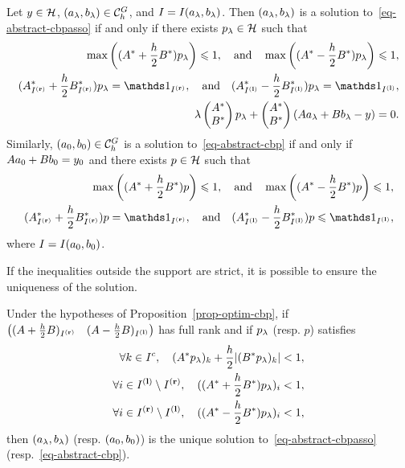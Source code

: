 \begin{prop}
  Let $y\in \mathcal{H}$, $(a_\lambda,b_\lambda) \in \mathcal{C}_h^G$, and $I=I(a_\lambda,b_\lambda)$. Then $(a_\lambda,b_\lambda)$ is a solution to~\eqref{eq-abstract-cbpasso} if and only if there exists $p_\lambda\in \mathcal{H}$ such that
\begin{align}
  \max\left( (\OpU^*+\frac{h}{2}\OpD^*)p_\la\right) \leq 1, \qandq \max\left( (\OpU^*-\frac{h}{2}\OpD^*)p_{\la}\right) \leq 1,\\
  (\OpU_{\Iup}^*+\frac{h}{2}\OpD_{\Iup}^*)p_{\la} =\bun_{\Iup}, \qandq (\OpU_{\Idown}^*-\frac{h}{2}\OpD_{\Idown}^*)p_{\la} = \bun_{\Idown},\label{eq-optimal-cbp-subdiff}\\
  \la \begin{pmatrix}\OpU^* \\ \OpD^* \end{pmatrix}p_{\la} + \begin{pmatrix}\OpU^* \\ \OpD^*\end{pmatrix}(\OpU \veccont_\la +\OpD \shiftcont_\la-y) =0. \label{eq-optimal-cbp-lagrange}
\end{align}
Similarly,  $(a_0,b_0)\in \mathcal{C}_h^G$ is a solution to~\eqref{eq-abstract-cbp} if and only if ${A}a_0 + {B}b_0=y_0$ and there exists $p\in \mathcal{H}$ such that
 \begin{align}
   \max\left( (\OpU^*+\frac{h}{2}\OpD^*)p\right) \leq 1, \qandq \max\left((\OpU^*-\frac{h}{2}\OpD^*)p\right) \leq 1,\\
  (\OpU_{\Iup}^*+\frac{h}{2}\OpD_{\Iup}^*)p =\bun_{\Iup}, \qandq (\OpU_{\Idown}^*-\frac{h}{2}\OpD_{\Idown}^*)p \leq \bun_{\Idown},
\end{align}
  where $I=I(a_0,b_0)$.
 \label{prop-optim-cbp}
\end{prop}

If the inequalities outside the support are strict, it is possible to ensure the uniqueness of the solution.

\begin{prop}
  Under the hypotheses of Proposition~\ref{prop-optim-cbp}, if $\begin{pmatrix}({A}+\frac{h}{2}{B})_{{I^{\mathbf{(r)}}}} &({A}-\frac{h}{2}{B})_{{I^{\mathbf{(l)}}}}\end{pmatrix}$ has full rank and if $p_\lambda$ (resp. $p$) satisfies
  \begin{align}
\forall k\in I^c, \quad  ({A}^*p_\lambda)_k+ \frac{h}{2}|({B}^*p_\lambda)_k| <1,\\
\forall i\in {I^{\mathbf{(l)}}}\setminus{I^{\mathbf{(r)}}},\quad  (({A}^* + \frac{h}{2}{B}^*)p_\lambda)_i <1,\\
\forall i\in {I^{\mathbf{(r)}}}\setminus{I^{\mathbf{(l)}}},\quad  (({A}^*- \frac{h}{2}{B}^*)p_\lambda)_i <1,
   \end{align}
   then $(a_\lambda,b_\lambda)$ (resp. $(a_0,b_0)$) is the unique solution to~\eqref{eq-abstract-cbpasso} (resp.~\eqref{eq-abstract-cbp}).
\label{prop-cbp-strict}
\end{prop}

